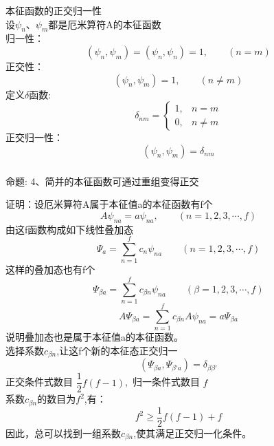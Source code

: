 \begin{frame} [allowframebreaks=]
    \frametitle{}
    \alert{本征函数的正交归一性}\\
    设$\psi_n$、$\psi_m$都是厄米算符A的本征函数\\
    归一性：
    \begin{equation*}
        (\psi_n, \psi_m)=(\psi_n, \psi_n)=1, \qquad (n=m)
    \end{equation*}  
    正交性：
    \begin{equation*}
        (\psi_n, \psi_m)=1, \qquad (n\neq m)
    \end{equation*}
    定义$\delta$函数:
    \begin{equation*}
        \delta_{n m}= 
        \begin{cases}1, & n=m \\ 
            0, & n \neq m
        \end{cases}
        \end{equation*}
    正交归一性：
    \begin{equation*}
        (\psi_n, \psi_m)=\delta_{nm}
    \end{equation*}
\end{frame} 

\begin{frame} [allowframebreaks=]
    \frametitle{}
    \begin{tcolorbox1}{命题:}
        4、简并的本征函数可通过重组变得正交
     \end{tcolorbox1}
    \alert{证明：}设厄米算符A属于本征值a的本征函数有f个
    \begin{equation*}
        A\psi_{na}=a\psi_{na}, \qquad (n=1,2,3,\cdots, f)
    \end{equation*}  
    由这f函数构成如下线性叠加态
    \begin{equation*}
        \Psi_a=\sum_{n=1}^{f} c_n \psi_{na} \qquad (n=1,2,3,\cdots, f)
    \end{equation*}
    这样的叠加态也有f个
    \begin{equation*}
        \Psi_{\beta a}=\sum_{n=1}^{f} c_{\beta n} \psi_{na} \qquad (\beta=1,2,3,\cdots, f)
    \end{equation*}
    \begin{equation*}
        A\Psi_{\beta a}=\sum_{n=1}^{f} c_{\beta n} A\psi_{na} =a \Psi_{\beta a}
    \end{equation*}
   说明叠加态也是属于本征值a的本征函数。\\
   选择系数$c_{\beta n}$,让这f个新的本征态正交归一
   \begin{equation*}
    (\Psi_{\beta a}, \Psi_{\beta' a})=\delta_{\beta\beta'}
    \end{equation*}
    正交条件式数目 $\dfrac{1}{2}f(f-1)$, 归一条件式数目 $f$\\
    系数$c_{\beta n}$的数目为$f^2$,有：$$ f^2\ge \dfrac{1}{2}f(f-1)+f$$
    因此，总可以找到一组系数$c_{\beta n}$,使其满足正交归一化条件。
\end{frame} 

